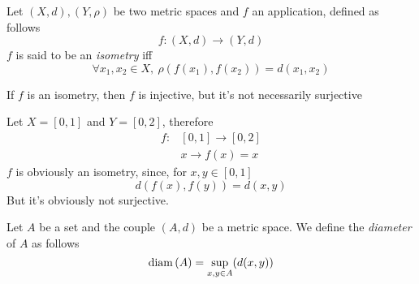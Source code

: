 \documentclass[../complete.tex]{subfiles}
\begin{document}
\begin{dfn}[Isometry]
	Let $(X,d),(Y,\rho)$ be two metric spaces and $f$ an application, defined as follows
	\begin{equation*}
		f:(X,d)\to(Y,d)
	\end{equation*}
	$f$ is said to be an \textit{isometry} iff
	\begin{equation*}
		\forall x_1,x_2\in X,\ \rho(f(x_1),f(x_2))=d(x_1,x_2)
	\end{equation*}
\end{dfn}
\begin{rmk}
	If $f$ is an isometry, then $f$ is injective, but it's not necessarily surjective
\end{rmk}
\begin{eg}
	Let $X=[0,1]$ and $Y=[0,2]$, therefore
	\begin{equation*}
		\begin{aligned}
			f:&[0,1]\to[0,2]\\
			&x\to f(x)=x
		\end{aligned}
	\end{equation*}
	$f$ is obviously an isometry, since, for $x,y\in[0,1]$
	\begin{equation*}
		d(f(x),f(y))=d(x,y)
	\end{equation*}
	But it's obviously not surjective.
\end{eg}
\begin{dfn}
	Let $A$ be a set and the couple $(A,d)$ be a metric space. We define the \textit{diameter} of $A$ as follows
	\begin{equation*}
		\operatorname{diam}{(A)}=\sup_{x,y\in A}(d(x,y))
	\end{equation*}
\end{dfn}
\end{document}
